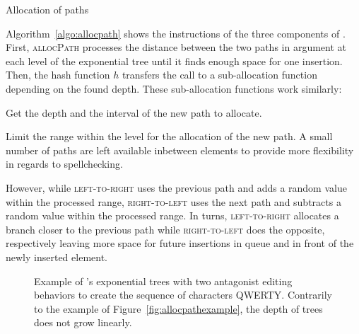 \begin{algorithm}

\caption{\label{algo:allocpath}Allocation of paths}
\end{algorithm}

Algorithm~\ref{algo:allocpath} shows the instructions of the three components of
\LSEQ. First, \textsc{allocPath} processes the distance between the two paths in
argument at each level of the exponential tree until it finds enough space for
one insertion.  Then, the hash function $h$ transfers the call to a
sub-allocation function depending on the found depth. These sub-allocation
functions work similarly:
\begin{inparaenum}[(i)]
\item Get the depth and the interval of the new path to allocate.
\item Limit the range within the level for the allocation of the new path. A
  small number of paths are left available inbetween elements to provide more
  flexibility in regards to spellchecking.
\item However, while \textsc{left-to-right} uses the previous path and adds a
  random value within the processed range, \textsc{right-to-left} uses the next
  path and subtracts a random value within the processed range. In turns,
  \textsc{left-to-right} allocates a branch closer to the previous path while
  \textsc{right-to-left} does the opposite, respectively leaving more space for
  future insertions in queue and in front of the newly inserted element.
\end{inparaenum}

\begin{figure}
  \centering
  \caption{\label{fig:lseqtreeexample} Example of \LSEQ's exponential trees with
    two antagonist editing behaviors to create the sequence of characters
    QWERTY. Contrarily to the example of Figure~\ref{fig:allocpathexample}, the
    depth of trees does not grow linearly.}
\end{figure}



